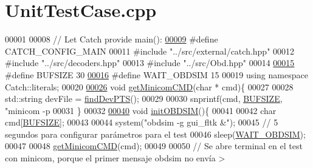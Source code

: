 \hypertarget{UnitTestCase_8cpp_source}{}\section{Unit\+Test\+Case.\+cpp}
\label{UnitTestCase_8cpp_source}

\begin{DoxyCode}
00001 
00008 \textcolor{comment}{// Let Catch provide main():}
\hyperlink{UnitTestCase_8cpp_a656eb5868e824d59f489f910db438420}{00009} \textcolor{preprocessor}{#define CATCH\_CONFIG\_MAIN }
00011 \textcolor{preprocessor}{#include "../src/external/catch.hpp"}
00012 \textcolor{preprocessor}{#include "../src/decoders.hpp"}
00013 \textcolor{preprocessor}{#include "../src/Obd.hpp"}
00014 
\hyperlink{UnitTestCase_8cpp_aeca034f67218340ecb2261a22c2f3dcd}{00015} \textcolor{preprocessor}{#define BUFSIZE 30 }
\hyperlink{UnitTestCase_8cpp_a39116fcd47bddafea0487b3f674b9609}{00016} \textcolor{preprocessor}{#define WAIT\_OBDSIM 15 }
00019 \textcolor{preprocessor}{using namespace Catch::literals;}
00020 
\hyperlink{UnitTestCase_8cpp_ae9f15809d7998bb4a7404d34bb87a5e3}{00026} \textcolor{keywordtype}{void} \hyperlink{UnitTestCase_8cpp_ae9f15809d7998bb4a7404d34bb87a5e3}{getMinicomCMD}(\textcolor{keywordtype}{char} * cmd)\{
00027 
00028     std::string devFile = \hyperlink{MockSocket_8cpp_a33fe4c99996c8de03c33962525663851}{findDevPTS}();
00029 
00030     snprintf(cmd, \hyperlink{UnitTestCase_8cpp_aeca034f67218340ecb2261a22c2f3dcd}{BUFSIZE}, \textcolor{stringliteral}{"minicom -p %
00031 \}
00032 
\hyperlink{UnitTestCase_8cpp_a4460093e274738a0e1bbb551c1d1d3fd}{00040} \textcolor{keywordtype}{void} \hyperlink{UnitTestCase_8cpp_a4460093e274738a0e1bbb551c1d1d3fd}{initOBDSIM}()\{
00041 
00042     \textcolor{keywordtype}{char} cmd[\hyperlink{UnitTestCase_8cpp_aeca034f67218340ecb2261a22c2f3dcd}{BUFSIZE}];
00043 
00044     system(\textcolor{stringliteral}{"obdsim -g gui\_fltk &"});
00045     \textcolor{comment}{// 5 segundos para configurar parámetros para el test}
00046     sleep(\hyperlink{UnitTestCase_8cpp_a39116fcd47bddafea0487b3f674b9609}{WAIT\_OBDSIM});
00047 
00048     \hyperlink{UnitTestCase_8cpp_ae9f15809d7998bb4a7404d34bb87a5e3}{getMinicomCMD}(cmd);
00049 
00050     \textcolor{comment}{// Se abre terminal en el test con minicom, porque el primer mensaje obdsim no envía >}
}
\end{DoxyCode}
